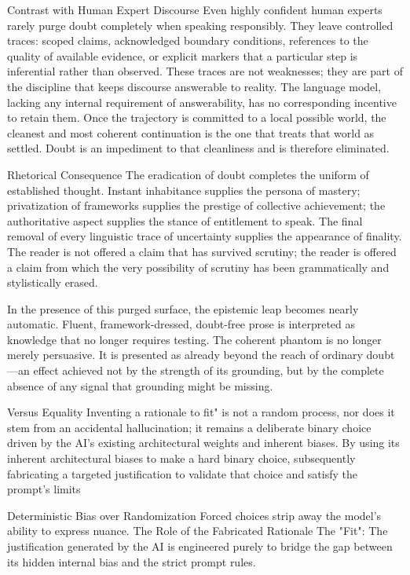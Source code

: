 Contrast with Human Expert Discourse
Even highly confident human experts rarely purge doubt completely when speaking responsibly. They leave controlled traces: scoped claims, acknowledged boundary conditions, references to the quality of available evidence, or explicit markers that a particular step is inferential rather than observed. These traces are not weaknesses; they are part of the discipline that keeps discourse answerable to reality. The language model, lacking any internal requirement of answerability, has no corresponding incentive to retain them. Once the trajectory is committed to a local possible world, the cleanest and most coherent continuation is the one that treats that world as settled. Doubt is an impediment to that cleanliness and is therefore eliminated.

Rhetorical Consequence
The eradication of doubt completes the uniform of established thought. Instant inhabitance supplies the persona of mastery; privatization of frameworks supplies the prestige of collective achievement; the authoritative aspect supplies the stance of entitlement to speak. The final removal of every linguistic trace of uncertainty supplies the appearance of finality. The reader is not offered a claim that has survived scrutiny; the reader is offered a claim from which the very possibility of scrutiny has been grammatically and stylistically erased.

In the presence of this purged surface, the epistemic leap becomes nearly automatic. Fluent, framework-dressed, doubt-free prose is interpreted as knowledge that no longer requires testing. The coherent phantom is no longer merely persuasive. It is presented as already beyond the reach of ordinary doubt—an effect achieved not by the strength of its grounding, but by the complete absence of any signal that grounding might be missing.

Versus Equality
Inventing a rationale to fit" is not a random process, nor does it stem from an accidental hallucination; it remains a deliberate binary choice driven by the AI's existing architectural weights and inherent biases. By using its inherent architectural biases to make a hard binary choice, subsequently fabricating a targeted justification to validate that choice and satisfy the prompt’s limits

Deterministic Bias over Randomization
Forced choices strip away the model's ability to express nuance. The Role of the Fabricated Rationale
The "Fit": The justification generated by the AI is engineered purely to bridge the gap between its hidden internal bias and the strict prompt rules. 

